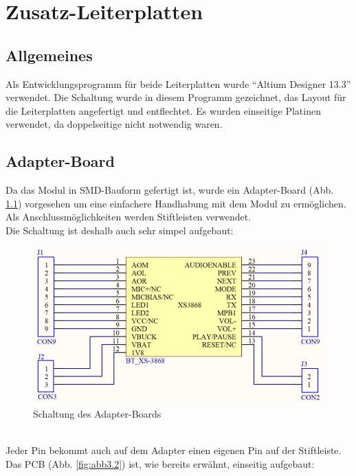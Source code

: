 \chapter{Zusatz-Leiterplatten}
\section{Allgemeines}
Als Entwicklungsprogramm für beide Leiterplatten wurde  \enquote{Altium Designer 13.3} verwendet. Die Schaltung wurde in diesem Programm gezeichnet, das Layout für die Leiterplatten angefertigt und entflechtet. Es wurden einseitige Platinen verwendet, da doppelseitige nicht notwendig waren.


\section{Adapter-Board}
Da das Modul in SMD-Bauform gefertigt ist, wurde ein Adapter-Board (Abb. \ref{fig:abb3.1}) vorgesehen um eine einfachere Handhabung mit dem Modul zu ermöglichen. Als Anschlussmöglichkeiten werden Stiftleisten verwendet.\\
Die Schaltung ist deshalb auch sehr simpel aufgebaut:
\begin{figure} [h]
	\centering
	\includegraphics[width=1\textwidth]{schaltungen/adapter_sch.png}
	\caption{Schaltung des Adapter-Boards}\label {fig:abb3.1}
\end{figure} \\
Jeder Pin bekommt auch auf dem Adapter einen eigenen Pin auf der Stiftleiste.
\newpage
Das PCB (Abb. \ref{fig:abb3.2}) ist, wie bereits erwähnt, einseitig aufgebaut:
